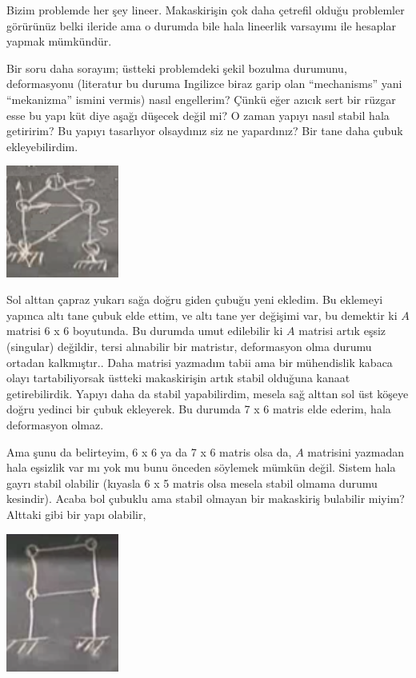 \documentclass[12pt,fleqn]{article}\usepackage{../../common}
\begin{document}
Bizim problemde her şey lineer. Makaskirişin çok daha çetrefil olduğu problemler
görürünüz belki ileride ama o durumda bile hala lineerlik varsayımı ile hesaplar
yapmak mümkündür.

Bir soru daha sorayım; üstteki problemdeki şekil bozulma durumunu, deformasyonu
(literatur bu duruma Ingilizce biraz garip olan ``mechanisms'' yani
``mekanizma'' ismini vermis) nasıl engellerim? Çünkü eğer azıcık sert bir rüzgar
esse bu yapı küt diye aşağı düşecek değil mi? O zaman yapıyı nasıl stabil hala
getiririm? Bu yapıyı tasarlıyor olsaydınız siz ne yapardınız? Bir tane daha
çubuk ekleyebilirdim.

\includegraphics[width=10em]{compscieng_1_15_05.png}

Sol alttan çapraz yukarı sağa doğru giden çubuğu yeni ekledim. Bu eklemeyi
yapınca altı tane çubuk elde ettim, ve altı tane yer değişimi var, bu demektir
ki $A$ matrisi 6 x 6 boyutunda. Bu durumda umut edilebilir ki $A$ matrisi artık
eşsiz (singular) değildir, tersi alınabilir bir matristır, deformasyon olma
durumu ortadan kalkmıştır.. Daha matrisi yazmadım tabii ama bir mühendislik
kabaca olayı tartabiliyorsak üstteki makaskirişin artık stabil olduğuna kanaat
getirebilirdik. Yapıyı daha da stabil yapabilirdim, mesela sağ alttan sol üst
köşeye doğru yedinci bir çubuk ekleyerek. Bu durumda 7 x 6 matris elde ederim,
hala deformasyon olmaz.

Ama şunu da belirteyim, 6 x 6 ya da 7 x 6 matris olsa da, $A$ matrisini yazmadan
hala eşsizlik var mı yok mu bunu önceden söylemek mümkün değil. Sistem hala
gayrı stabil olabilir (kıyasla 6 x 5 matris olsa mesela stabil olmama durumu
kesindir). Acaba bol çubuklu ama stabil olmayan bir makaskiriş bulabilir miyim?
Alttaki gibi bir yapı olabilir,

\includegraphics[width=10em]{compscieng_1_15_06.png}
\end{document}
